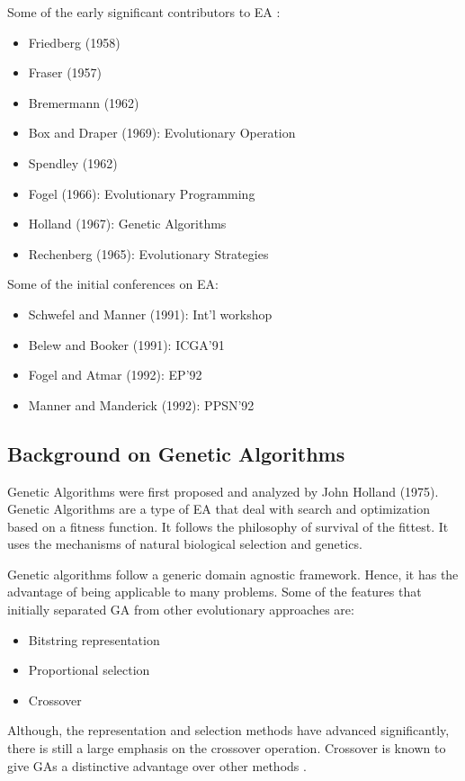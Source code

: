 \documentclass[12pt,a4paper]{article}
\begin{document}
	Some of the early significant contributors to EA \cite{handbook}:
	\begin{itemize}
	\item Friedberg (1958)
	\item Fraser (1957)
	\item Bremermann (1962)
	\item Box and Draper (1969): Evolutionary Operation
	\item Spendley (1962)
	\item Fogel (1966): Evolutionary Programming
	\item Holland (1967): Genetic Algorithms
	\item Rechenberg (1965): Evolutionary Strategies
	\end{itemize}
	
	Some of the initial conferences on EA:
	\begin{itemize}
	\item Schwefel and Manner (1991): Int'l workshop
	\item Belew and Booker (1991): ICGA'91
	\item Fogel and Atmar (1992): EP'92
	\item Manner and Manderick (1992): PPSN'92
	\end{itemize}
	
	\subsection{Background on Genetic Algorithms}
	Genetic Algorithms were first proposed and analyzed by John Holland (1975). Genetic Algorithms are a type of EA that deal with search and optimization based on a fitness function. It follows the philosophy of survival of the fittest. It uses the mechanisms of natural biological selection and genetics. \par
	Genetic algorithms follow a generic domain agnostic framework. Hence, it has the advantage of being applicable to many problems. Some of the features that initially separated GA from other evolutionary approaches are:
	\begin{itemize}	
	\item Bitstring representation
	\item Proportional selection
	\item Crossover
	\end{itemize}
	Although, the representation and selection methods have advanced significantly, there is still a large emphasis on the crossover operation. Crossover is known to give GAs a distinctive advantage over other methods \cite{handbook}. \par
	
\end{document}
